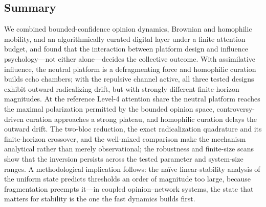 \documentclass[5p,times,twocolumn]{elsarticle}
\begin{document}
\subsection{Summary} We combined bounded-confidence opinion dynamics,
Brownian and homophilic mobility, and an algorithmically curated digital
layer under a finite attention budget, and found that the interaction
between platform design and influence psychology---not either
alone---decides the collective outcome. With assimilative influence, the
neutral platform is a defragmenting force and homophilic curation builds
echo chambers; with the repulsive channel active, all three tested
designs exhibit outward radicalizing drift, but with strongly different
finite-horizon magnitudes. At the reference Level-4 attention share the
neutral platform reaches the maximal polarization permitted by the bounded
opinion space, controversy-driven curation approaches a strong plateau,
and homophilic curation delays the outward drift. The two-bloc reduction,
the exact radicalization quadrature and its finite-horizon crossover, and
the well-mixed comparison make the mechanism analytical rather than
merely observational; the robustness and finite-size scans show that the
inversion persists across the tested parameter and system-size ranges. A methodological implication follows: the na\"ive
linear-stability analysis of the uniform state predicts thresholds an
order of magnitude too large, because fragmentation preempts it---in
coupled opinion--network systems, the state that matters for stability is
the one the fast dynamics builds first.
\end{document}
